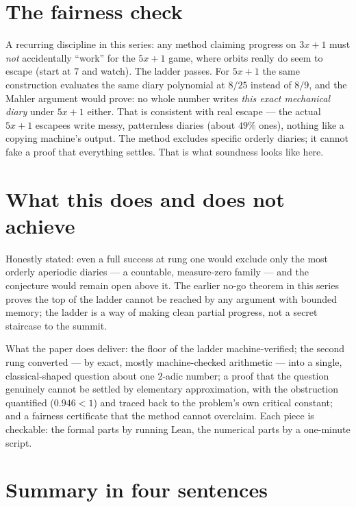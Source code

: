 \documentclass[11pt]{article}
\begin{document}
\section{The fairness check}

A recurring discipline in this series: any method claiming progress
on $3x+1$ must \emph{not} accidentally ``work'' for the $5x+1$ game,
where orbits really do seem to escape (start at $7$ and watch). The
ladder passes. For $5x+1$ the same construction evaluates the same
diary polynomial at $8/25$ instead of $8/9$, and the Mahler argument
would prove: no whole number writes \emph{this exact mechanical
diary} under $5x+1$ either. That is consistent with real escape ---
the actual $5x+1$ escapees write messy, patternless diaries (about
$49\%$ ones), nothing like a copying machine's output. The method
excludes specific orderly diaries; it cannot fake a proof that
everything settles. That is what soundness looks like here.

\section{What this does and does not achieve}

Honestly stated: even a full success at rung one would exclude only
the most orderly aperiodic diaries --- a countable, measure-zero
family --- and the conjecture would remain open above it. The earlier
no-go theorem in this series proves the top of the ladder cannot be
reached by any argument with bounded memory; the ladder is a way of
making clean partial progress, not a secret staircase to the summit.

What the paper does deliver: the floor of the ladder machine-verified;
the second rung converted --- by exact, mostly machine-checked
arithmetic --- into a single, classical-shaped question about one
$2$-adic number; a proof that the question genuinely cannot be
settled by elementary approximation, with the obstruction quantified
($0.946 < 1$) and traced back to the problem's own critical constant;
and a fairness certificate that the method cannot overclaim. Each
piece is checkable: the formal parts by running Lean, the numerical
parts by a one-minute script.

\section{Summary in four sentences}
\end{document}
